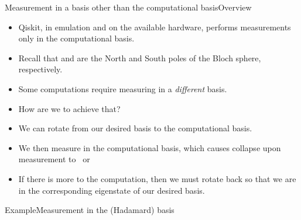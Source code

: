 
\begin{frame}{Measurement in a basis other than the computational basis}{Overview}

\begin{itemize}[<+->]
    \item Qiskit, in emulation and on the available hardware, performs measurements only in the computational basis.
    \item Recall that \QZero{} and \QOne{} are the North and South poles of the Bloch sphere, respectively.
    \item Some computations require measuring in a \emph{different} basis.
    \item How are we to achieve that?
    \item We can rotate from our desired basis to the computational basis.
    \item We then measure in the computational basis, which causes collapse upon measurement to~\QZero{} or~\QOne{}
    \item If there is more to the computation, then we must rotate back so that we are in the corresponding eigenstate of our desired basis.
\end{itemize}
    
\end{frame}

\begin{frame}{Example}{Measurement in the  (Hadamard) basis}
\Vskip{-4em}
    
\end{frame}